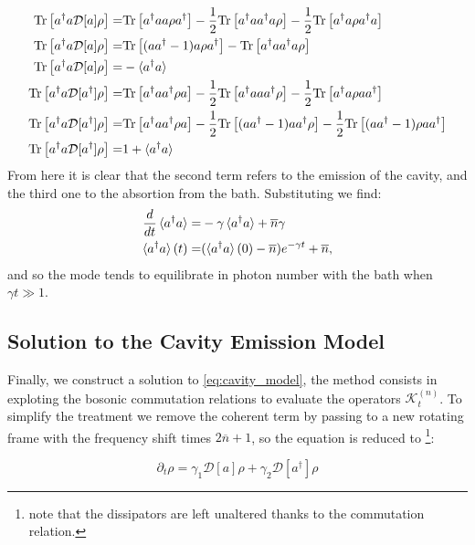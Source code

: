 \begin{align}
  \mathrm{Tr}\left[a^{\dagger}a\mathcal{D}[a]\rho\right] =& \mathrm{Tr}\left[a^{\dagger}aa\rho a^{\dagger}\right]-\frac{1}{2}\mathrm{Tr}\left[a^{\dagger}aa^{\dagger}a\rho\right]-\frac{1}{2}\mathrm{Tr}\left[a^{\dagger}a\rho a^{\dagger}a\right] \\
  \mathrm{Tr}\left[a^{\dagger}a\mathcal{D}[a]\rho\right] =& \mathrm{Tr}\left[(aa^{\dagger}-1)a\rho a^{\dagger}\right] - \mathrm{Tr}\left[a^{\dagger}aa^{\dagger}a\rho\right]\\
  \mathrm{Tr}\left[a^{\dagger}a\mathcal{D}[a]\rho\right] =&-\braket{a^{\dagger}a}\\
\mathrm{Tr}\left[a^{\dagger}a\mathcal{D}[a^{\dagger}]\rho\right] =& \mathrm{Tr}\left[a^{\dagger}aa^{\dagger}\rho a\right] - \frac{1}{2}\mathrm{Tr}\left[a^{\dagger}aaa^{\dagger}\rho\right] - \frac{1}{2}\mathrm{Tr}\left[a^{\dagger}a\rho aa^{\dagger}\right]\\
\mathrm{Tr}\left[a^{\dagger}a\mathcal{D}[a^{\dagger}]\rho\right] =& \mathrm{Tr}\left[a^{\dagger}aa^{\dagger}\rho a\right] - \frac{1}{2}\mathrm{Tr}\left[(aa^{\dagger}-1)aa^{\dagger}\rho\right] - \frac{1}{2}\mathrm{Tr}\left[(aa^{\dagger}-1)\rho aa^{\dagger}\right]\\
\mathrm{Tr}\left[a^{\dagger}a\mathcal{D}[a^{\dagger}]\rho\right] =& 1+ \braket{a^{\dagger}a}
\end{align}
From here it is clear that the second term refers to the emission of the cavity, and the third one to the absortion from the bath. Substituting
we find:
\begin{align}
  \frac{d}{dt}\braket{a^{\dagger}a} = &-\gamma\braket{a^{\dagger}a} + \overline{n}\gamma\\
  \braket{a^{\dagger}a}(t) =& (\braket{a^{\dagger}a}(0)-\overline{n})e^{-\gamma t} + \overline{n},
\end{align}
and so the mode tends to equilibrate in photon number with the bath when $\gamma t\gg 1$.
\subsection{Solution to the Cavity Emission Model}
Finally, we construct a solution to \eqref{eq:cavity_model}, the method consists in exploting the bosonic commutation relations
to evaluate the operators $\mathcal{K}^{(n)}_{t}$. To simplify the treatment we remove the coherent term by passing to a new rotating frame
with the frequency shift times $2\overline{n}+1$, so the equation is reduced to \footnote{note that the dissipators are left unaltered thanks to the commutation relation.}:

\begin{equation}
\partial_{t}\rho = \gamma_{1}\mathcal{D}[a]\rho + \gamma_{2}\mathcal{D}[a^{\dagger}]\rho
\end{equation}

